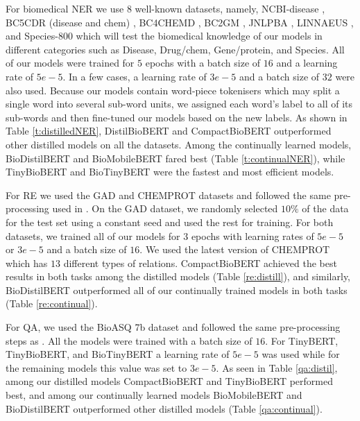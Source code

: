 \documentclass{article}
\begin{document}
For biomedical NER we use 8 well-known datasets, namely, NCBI-disease \citep{dougan2014ncbi}, BC5CDR (disease and chem) \citep{li2016biocreative}, BC4CHEMD \citep{krallinger2015chemdner}, BC2GM \citep{smith2008overview}, JNLPBA \citep{kim2004introduction}, LINNAEUS \citep{gerner2010linnaeus}, and Species-800 \citep{pafilis2013species} which will test the biomedical knowledge of our models in different categories such as Disease, Drug/chem, Gene/protein, and Species. All of our models were trained for $5$ epochs with a batch size of $16$ and a learning rate of $5e-5$. In a few cases, a learning rate of $3e-5$ and a batch size of $32$ were also used. Because our models contain word-piece tokenisers which may split a single word into several sub-word units, we assigned each word's label to all of its sub-words and then fine-tuned our models based on the new labels. As shown in Table \ref{t:distilledNER}, DistilBioBERT and CompactBioBERT outperformed other distilled models on all the datasets. Among the continually learned models, BioDistilBERT and BioMobileBERT fared best (Table \ref{t:continualNER}), while TinyBioBERT and BioTinyBERT were the fastest and most efficient models.

For RE we used the GAD \citep{bravo2015extraction} and CHEMPROT \citep{krallinger2017overview} datasets and followed the same pre-processing used in \citet{lee2020biobert}. On the GAD dataset, we randomly selected $10\%$ of the data for the test set using a constant seed and used the rest for training. For both datasets, we trained all of our models for $3$ epochs with learning rates of $5e-5$ or $3e-5$ and a batch size of $16$. We used the latest version of CHEMPROT which has $13$ different types of relations. CompactBioBERT achieved the best results in both tasks among the distilled models (Table \ref{re:distill}), and similarly, BioDistilBERT outperformed all of our continually trained models in both tasks (Table \ref{re:continual}). 

For QA, we used the BioASQ 7b dataset \citep{tsatsaronis2015overview} and followed the same pre-processing steps as \citet{lee2020biobert}. All the models were trained with a batch size of $16$. For TinyBERT, TinyBioBERT, and BioTinyBERT a learning rate of $5e-5$ was used while for the remaining models this value was set to $3e-5$. As seen in Table \ref{qa:distil}, among our distilled models CompactBioBERT and TinyBioBERT performed best, and  among our continually learned models BioMobileBERT and BioDistilBERT outperformed other distilled models (Table \ref{qa:continual}). 
\end{document}
